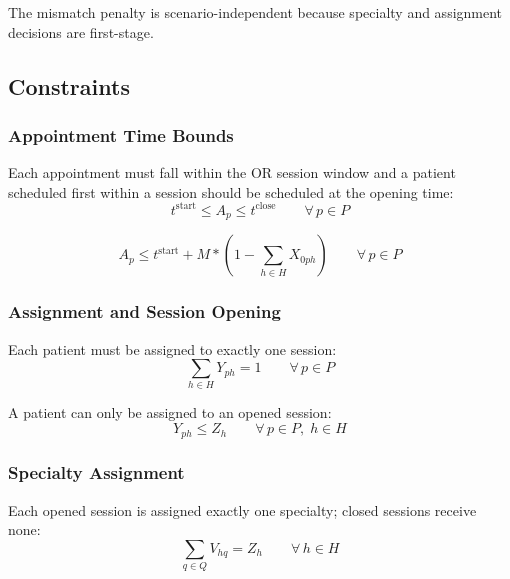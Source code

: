 The mismatch penalty is scenario-independent because specialty and assignment
decisions are first-stage.

\subsection{Constraints}

\subsubsection{Appointment Time Bounds}

Each appointment must fall within the OR session window and a patient scheduled first within a session should be scheduled at the opening time:
%
\begin{equation}
  t^{\text{start}} \leq A_p \leq t^{\text{close}}
  \qquad \forall\, p \in P
  \label{eq:appt_bounds}
\end{equation}

\begin{equation}
  A_p \leq t^{\text{start}}+M*(1-\sum_{h \in H}X_{0ph})
  \qquad \forall\, p \in P
  \label{eq:start_first}
\end{equation}

\subsubsection{Assignment and Session Opening}

Each patient must be assigned to exactly one session:
%
\begin{equation}
  \sum_{h \in H} Y_{ph} = 1
  \qquad \forall\, p \in P
  \label{eq:assign}
\end{equation}

A patient can only be assigned to an opened session:
%
\begin{equation}
  Y_{ph} \leq Z_h
  \qquad \forall\, p \in P,\; h \in H
  \label{eq:open}
\end{equation}

\subsubsection{Specialty Assignment}

Each opened session is assigned exactly one specialty; closed sessions receive
none:
%
\begin{equation}
  \sum_{q \in Q} V_{hq} = Z_h
  \qquad \forall\, h \in H
  \label{eq:spec}
\end{equation}

